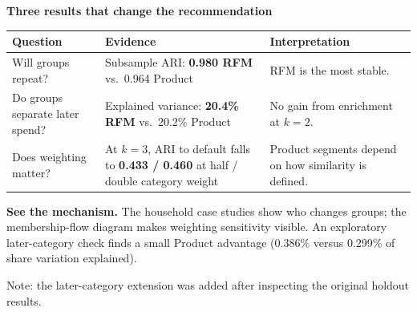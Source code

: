 \vfill
{\large\bfseries\color{ink} Three results that change the recommendation}\par
\vspace{1mm}
{\renewcommand{\arraystretch}{1.3}
\begin{tabularx}{\textwidth}{@{}>{\raggedright\arraybackslash}p{36mm}>{\raggedright\arraybackslash}X>{\raggedright\arraybackslash}p{48mm}@{}}
\toprule
\textbf{Question} & \textbf{Evidence} & \textbf{Interpretation}\\\midrule
Will groups repeat? & Subsample ARI: \textbf{0.980 RFM} vs.\ 0.964 Product & RFM is the most stable.\\
Do groups separate later spend? & Explained variance: \textbf{20.4\% RFM} vs.\ 20.2\% Product & No gain from enrichment at $k=2$.\\
Does weighting matter? & At $k=3$, ARI to default falls to \textbf{0.433 / 0.460} at half / double category weight & Product segments depend on how similarity is defined.\\\bottomrule
\end{tabularx}}

\vfill
\begingroup
\setlength{\fboxsep}{8pt}
\endgroup

\vspace{4mm}
\textbf{See the mechanism.} The household case studies show who changes groups; the membership-flow diagram makes weighting sensitivity visible. An exploratory later-category check finds a small Product advantage (0.386\% versus 0.299\% of share variation explained).

\vfill
{\small\color{ink}Note: the later-category extension was added after inspecting the original holdout results.}
\clearpage
